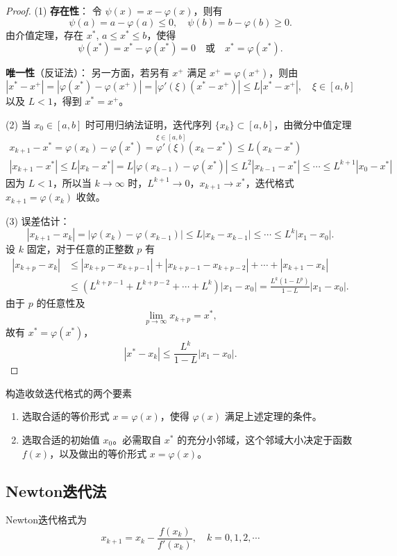 \begin{proof}
(1) \textbf{存在性}：
令 \(\psi(x) = x - \varphi(x)\)，则有
\[
\psi(a) = a - \varphi(a) \leq 0, \quad \psi(b) = b - \varphi(b) \geq 0.
\]
由介值定理，存在 \(x^*\), \(a \leq x^* \leq b\)，使得
\[
\psi(x^*) = x^* - \varphi(x^*) = 0 \quad \text{或} \quad x^* = \varphi(x^*).
\]

\textbf{唯一性}（反证法）：
另一方面，若另有 \(x^+\) 满足 \(x^+ = \varphi(x^+)\)，则由
\[
|x^* - x^+| = |\varphi(x^*) - \varphi(x^+)| = |\varphi'(\xi)(x^* - x^+)| \leq L|x^* - x^+|, \quad \xi \in [a,b]
\]
以及 \(L < 1\)，得到 \(x^* = x^+\)。

(2) 当 \(x_0 \in [a,b]\) 时可用归纳法证明，迭代序列 \(\{x_k\} \subset [a,b]\)，由微分中值定理
\begin{gather*}
    x_{k+1} - x^* = \varphi(x_k) - \varphi(x^*) = \overset{\xi \in [a,b]}{\varphi'(\xi)}(x_k - x^*)\leq L (x_k - x^*)
\\
|x_{k+1} - x^*| \leq L|x_k - x^*| = L|\varphi(x_{k-1}) - \varphi(x^*)| \leq L^2|x_{k-1} - x^*| \leq \cdots \leq L^{k+1}|x_0 - x^*|
\end{gather*}
因为 \(L < 1\)，所以当 \(k \to \infty\) 时，\(L^{k+1} \to 0\)，\(x_{k+1} \to x^*\)，迭代格式 \(x_{k+1} = \varphi(x_k)\) 收敛。

(3) 误差估计：
\[
|x_{k+1} - x_k| = |\varphi(x_k) - \varphi(x_{k-1})| \leq L|x_k - x_{k-1}| \leq \cdots \leq L^k|x_1 - x_0|.
\]
设 \(k\) 固定，对于任意的正整数 \(p\) 有
\begin{align*}
|x_{k+p} - x_k| &\leq |x_{k+p} - x_{k+p-1}| + |x_{k+p-1} - x_{k+p-2}| + \cdots + |x_{k+1} - x_k| \\
&\leq (L^{k+p-1} + L^{k+p-2} + \cdots + L^k)|x_1 - x_0| = \frac{L^k(1 - L^p)}{1 - L}|x_1 - x_0|.
\end{align*}
由于 \(p\) 的任意性及
\[
\lim_{p \to \infty} x_{k+p} = x^*,
\]
故有 \(x^* = \varphi(x^*)\)，
\[
|x^* - x_k| \leq \frac{L^k}{1 - L}|x_1 - x_0|.
\]
\end{proof}

构造收敛迭代格式的两个要素
\begin{enumerate}
    \item 选取合适的等价形式 \(x = \varphi(x)\)，使得 \(\varphi(x)\) 满足上述定理的条件。
    \item 选取合适的初始值 \(x_0\)。必需取自 \(x^*\) 的充分小邻域，这个邻域大小决定于函数 \(f(x)\)，以及做出的等价形式 \(x = \varphi(x)\)。
\end{enumerate}
\subsection{Newton迭代法}
Newton迭代格式为
\[x_{k+1}=x_k -\frac{f(x_k)}{f'(x_k)},\quad k=0,1,2,\cdots\]


